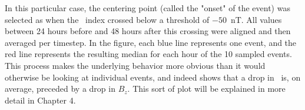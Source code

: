 In this particular case, the centering point (called the "onset" of the event) was selected as when the \dst\ index crossed below a threshold of $-50$~nT. All values between 24 hours before and 48 hours after this crossing were aligned and then averaged per timestep. In the figure, each blue line represents one event, and the red line represents the resulting median for each hour of the 10 sampled events. This process makes the underlying behavior more obvious than it would otherwise be looking at individual events, and indeed shows that a drop in \dst\ is, on average, preceded by a drop in $B_z$. This sort of plot will be explained in more detail in Chapter 4.



